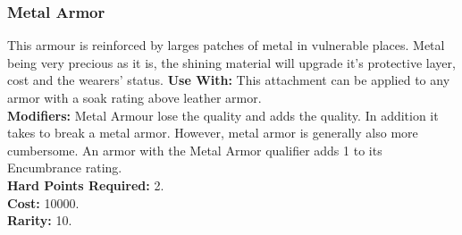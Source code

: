 \subsubsection{Metal Armor}
This armour is reinforced by larges patches of metal in vulnerable places. Metal
being very precious as it is, the shining material will upgrade it's protective
layer, cost and the wearers' status.
\textbf{Use With:} This attachment can be applied to any armor with a soak rating above leather armor.\\
\textbf{Modifiers:} Metal Armour lose the  quality and adds the  quality.
    In addition it takes \despair\despair to break a metal armor.
    However, metal armor is generally also more cumbersome. An armor with the Metal
    Armor qualifier adds 1 to its Encumbrance rating.\\
\textbf{Hard Points Required:} 2.\\
\textbf{Cost:} 10000.\\
\textbf{Rarity:} 10.\\
